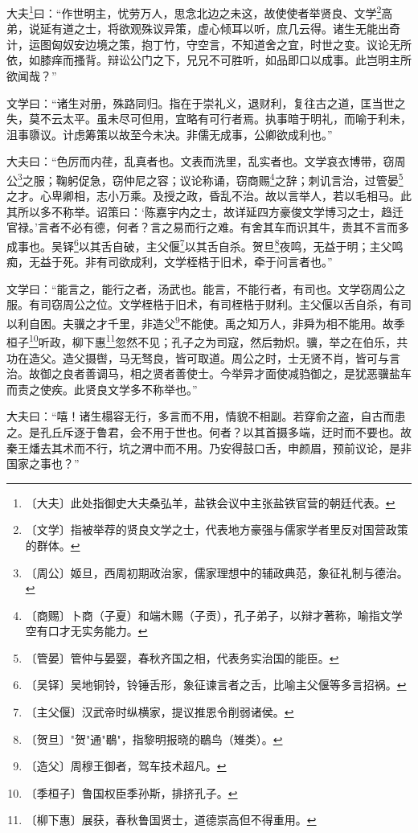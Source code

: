 \documentclass[12pt,UTF-8,openany]{ctexbook}
\begin{document}
\begin{normalsize}
    
    大夫\footnote{〔大夫〕此处指御史大夫桑弘羊，盐铁会议中主张盐铁官营的朝廷代表。}曰：“作世明主，忧劳万人，思念北边之未这，故使使者举贤良、文学\footnote{〔文学〕指被举荐的贤良文学之士，代表地方豪强与儒家学者里反对国营政策的群体。}高弟，说延有道之士，将欲观殊议异策，虚心倾耳以听，庶几云得。诸生无能出奇计，运图匈奴安边境之策，抱丁竹，守空言，不知道舍之宜，时世之变。议论无所依，如膝痒而搔背。辩讼公门之下，兄兄不可胜听，如品即口以成事。此岂明主所欲闻哉？”
    
    文学曰：“诸生对册，殊路同归。指在于崇礼义，退财利，复往古之道，匡当世之失，莫不云太平。虽未尽可但用，宜略有可行者焉。执事暗于明礼，而喻于利未，沮事隳议。计虑筹策以故至今未决。非儒无成事，公卿欲成利也。”
    
    大夫曰：“色厉而内荏，乱真者也。文表而洗里，乱实者也。文学哀衣博带，窃周公\footnote{〔周公〕姬旦，西周初期政治家，儒家理想中的辅政典范，象征礼制与德治。}之服；鞠躬促急，窃仲尼之容；议论称诵，窃商赐\footnote{〔商赐〕卜商（子夏）和端木赐（子贡），孔子弟子，以辩才著称，喻指文学空有口才无实务能力。}之辞；刺讥言治，过管晏\footnote{〔管晏〕管仲与晏婴，春秋齐国之相，代表务实治国的能臣。}之才。心卑卿相，志小万乘。及授之政，昏乱不治。故以言举人，若以毛相马。此其所以多不称举。诏策曰：‘陈嘉宇内之士，故详延四方豪俊文学博习之士，趋迁官禄。’言者不必有德，何者？言之易而行之难。有舍其车而识其牛，贵其不言而多成事也。吴铎\footnote{〔吴铎〕吴地铜铃，铃锤舌形，象征谏言者之舌，比喻主父偃等多言招祸。}以其舌自破，主父偃\footnote{〔主父偃〕汉武帝时纵横家，提议推恩令削弱诸侯。}以其舌自杀。贺旦\footnote{〔贺旦〕"贺"通"鶡"，指黎明报晓的鶡鸟（雉类）。}夜鸣，无益于明；主父鸣痴，无益于死。非有司欲成利，文学桎梏于旧术，牵于问言者也。”
    
    文学曰：“能言之，能行之者，汤武也。能言，不能行者，有司也。文学窃周公之服。有司窃周公之位。文学桎梏于旧术，有司桎梏于财利。主父偃以舌自杀，有司以利自困。夫骥之才千里，非造父\footnote{〔造父〕周穆王御者，驾车技术超凡。}不能使。禹之知万人，非舜为相不能用。故季桓子\footnote{〔季桓子〕鲁国权臣季孙斯，排挤孔子。}听政，柳下惠\footnote{〔柳下惠〕展获，春秋鲁国贤士，道德崇高但不得重用。}忽然不见；孔子之为司寇，然后勃炽。骥，举之在伯乐，共功在造父。造父摄辔，马无驽良，皆可取道。周公之时，士无贤不肖，皆可与言治。故御之良者善调马，相之贤者善使士。今举异才面使减驺御之，是犹恶骥盐车而责之使疾。此贤良文学多不称举也。”
    
    大夫曰：“嘻！诸生榻容无行，多言而不用，情貌不相副。若穿俞之盗，自古而患之。是孔丘斥逐于鲁君，会不用于世也。何者？以其首摄多端，迂时而不要也。故秦王燔去其术而不行，坑之渭中而不用。乃安得鼓口舌，申颜眉，预前议论，是非国家之事也？”
\end{normalsize}
\end{document}
